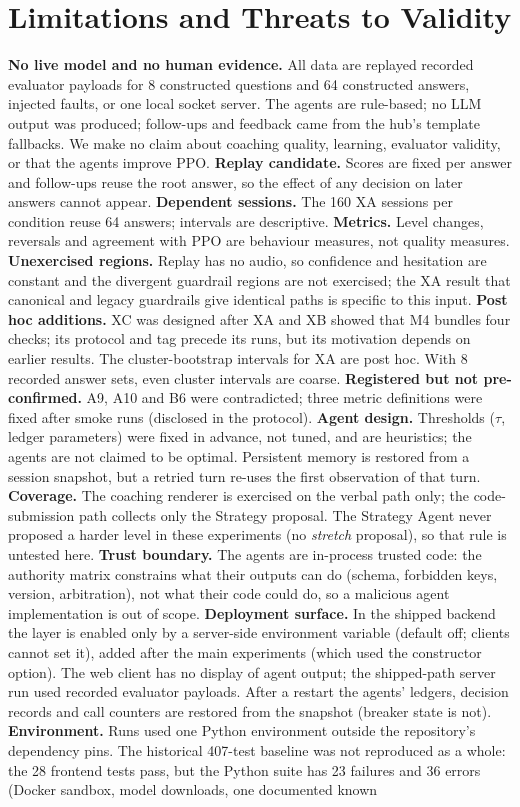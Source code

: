 \section{Limitations and Threats to Validity}\label{sec:limits}
\textbf{No live model and no human evidence.} All data are replayed recorded evaluator payloads for 8 constructed questions and 64 constructed answers, injected faults, or one local socket server. The agents are rule-based; no LLM output was produced; follow-ups and feedback came from the hub's template fallbacks. We make no claim about coaching quality, learning, evaluator validity, or that the agents improve PPO. \textbf{Replay candidate.} Scores are fixed per answer and follow-ups reuse the root answer, so the effect of any decision on later answers cannot appear. \textbf{Dependent sessions.} The 160 XA sessions per condition reuse 64 answers; intervals are descriptive. \textbf{Metrics.} Level changes, reversals and agreement with PPO are behaviour measures, not quality measures. \textbf{Unexercised regions.} Replay has no audio, so confidence and hesitation are constant and the divergent guardrail regions are not exercised; the XA result that canonical and legacy guardrails give identical paths is specific to this input. \textbf{Post hoc additions.} XC was designed after XA and XB showed that M4 bundles four checks; its protocol and tag precede its runs, but its motivation depends on earlier results. The cluster-bootstrap intervals for XA are post hoc. With 8 recorded answer sets, even cluster intervals are coarse. \textbf{Registered but not pre-confirmed.} A9, A10 and B6 were contradicted; three metric definitions were fixed after smoke runs (disclosed in the protocol). \textbf{Agent design.} Thresholds ($\tau$, ledger parameters) were fixed in advance, not tuned, and are heuristics; the agents are not claimed to be optimal. Persistent memory is restored from a session snapshot, but a retried turn re-uses the first observation of that turn. \textbf{Coverage.} The coaching renderer is exercised on the verbal path only; the code-submission path collects only the Strategy proposal. The Strategy Agent never proposed a harder level in these experiments (no \emph{stretch} proposal), so that rule is untested here. \textbf{Trust boundary.} The agents are in-process trusted code: the authority matrix constrains what their outputs can do (schema, forbidden keys, version, arbitration), not what their code could do, so a malicious agent implementation is out of scope. \textbf{Deployment surface.} In the shipped backend the layer is enabled only by a server-side environment variable (default off; clients cannot set it), added after the main experiments (which used the constructor option). The web client has no display of agent output; the shipped-path server run used recorded evaluator payloads. After a restart the agents' ledgers, decision records and call counters are restored from the snapshot (breaker state is not). \textbf{Environment.} Runs used one Python environment outside the repository's dependency pins. The historical 407-test baseline was not reproduced as a whole: the 28 frontend tests pass, but the Python suite has 23 failures and 36 errors (Docker sandbox, model downloads, one documented known 
